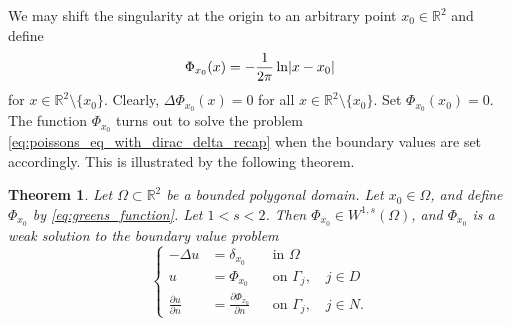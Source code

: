 \documentclass[english, 12pt, a4paper, sci, utf8, a-2b, online]{aaltothesis}
\theoremstyle{definition}
\theoremstyle{plain}
\newtheorem{theorem}{Theorem}[section]
\DeclarePairedDelimiter\abs{\lvert}{\rvert}
\numberwithin{equation}{section}
\begin{document}
We may shift the singularity at the origin to an arbitrary point
$x_0 \in \mathbb{R}^2$ and define
\begin{equation}
    \label{eq:greens_function}
    \Phi_{x_0}(x) = -\frac{1}{2 \pi} \ln \abs{x - x_0}
\end{equation}
for $x \in \mathbb{R}^2 \setminus \{ x_0 \}$.
Clearly, $\Delta \Phi_{x_0}(x) = 0$ for all $x \in \mathbb{R}^2 \setminus \{x_0\}$.
Set $\Phi_{x_0}(x_0) = 0$.
The function $\Phi_{x_0}$ turns out to solve the problem 
\eqref{eq:poissons_eq_with_dirac_delta_recap} when the boundary values
are set accordingly.
This is illustrated by the following theorem.
\begin{theorem}
    \label{thm:greens_function_is_solution}
    Let $\Omega \subset \mathbb{R}^2$ be a bounded polygonal domain.
    Let $x_0 \in \Omega$, and define $\Phi_{x_0}$ by \eqref{eq:greens_function}.
    Let $1 < s < 2$. Then $\Phi_{x_0} \in W^{1,s}(\Omega)$,
    and $\Phi_{x_0}$ is a weak solution to the boundary value problem
    \begin{equation}
        \label{eq:greens_function_is_solution_problem}
        \left\{
            \begin{aligned}
                -\Delta u &= \delta_{x_0} && \text{in } \Omega \\
                u &= \Phi_{x_0} && \text{on } \Gamma_j, \quad j \in D \\
                \frac{\partial u}{\partial n} &=
                \frac{\partial \Phi_{x_0}}{\partial n} && \text{on } \Gamma_j,
                \quad j \in N.
            \end{aligned}
        \right.
    \end{equation}
\end{theorem}
\end{document}
